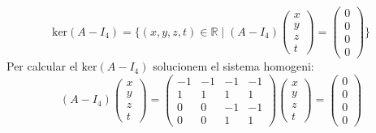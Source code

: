 \documentclass[11pt,a4paper]{article}
\begin{document}
    \begin{equation*}
        \text{ker}(A-I_4)=\{(x,y,z,t)\in \mathbb{R}\mid(A-I_4)\begin{pmatrix}
                x\\
                y\\
                z\\
                t
            \end{pmatrix}=\begin{pmatrix}
                0\\
                0\\
                0\\
                0
            \end{pmatrix}\}
    \end{equation*}
    Per calcular el $\text{ker}(A-I_4)$ solucionem el sistema homogeni:
    \begin{equation*}
            (A-I_4)\begin{pmatrix}
                x\\
                y\\
                z\\
                t
            \end{pmatrix}=\begin{pmatrix}
            -1 & -1 & -1 & -1\\
            1 & 1 & 1 & 1\\
            0 & 0 & -1 & -1\\
            0 & 0 & 1 & 1
            \end{pmatrix}\begin{pmatrix}
                x\\
                y\\
                z\\
                t
            \end{pmatrix}=\begin{pmatrix}
                0\\
                0\\
                0\\
                0
            \end{pmatrix}
        \end{equation*}
\end{document}
